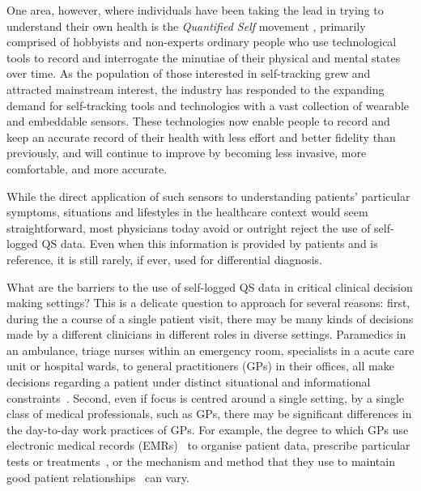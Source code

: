\documentclass{sigchi}
\begin{document}
One area, however, where individuals have been taking the lead in trying to understand their own health is the \emph{Quantified Self} movement \cite{Swan2012}, primarily comprised of hobbyists and non-experts ordinary people who use technological tools to record and interrogate the minutiae of their physical and mental states over time.   As the population of those interested in self-tracking grew and attracted mainstream interest, the industry has responded to the expanding demand for self-tracking tools and technologies with a vast collection of wearable and embeddable sensors.  These technologies now enable people to record and keep an accurate record of their health with less effort and better fidelity than previously, and will continue to improve by becoming less invasive, more comfortable, and more accurate.

While the direct application of such sensors to understanding patients' particular symptoms, situations and lifestyles in the healthcare context would seem straightforward, most physicians today avoid or outright reject the use of self-logged QS data. Even when this information is provided by patients and is reference, it is still rarely, if ever, used for differential diagnosis.  

What are the barriers to the use of self-logged QS data in critical clinical decision making settings?  This is a delicate question to approach for several reasons: first, during the a course of a single patient visit, there may be many kinds of decisions made by a different clinicians in different roles in diverse settings.   Paramedics in an ambulance, triage nurses within an emergency room, specialists in a acute care unit or hospital wards, to general practitioners (GPs) in their offices, all make decisions regarding a patient under distinct situational and informational constraints~\cite{Croskerry2013}. Second, even if focus is centred around a single setting, by a single class of medical professionals, such as GPs, there may be significant differences in the day-to-day work practices of GPs. For example, the degree to which GPs use electronic medical records (EMRs)~\cite{hunt} to organise patient data, prescribe particular tests or treatments~\cite{}, or the mechanism and method that they use to maintain good patient relationships~\cite{} can vary. 
\end{document}
